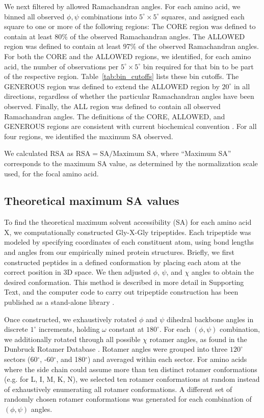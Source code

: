 \documentclass[11pt]{article}
\begin{document}
We next filtered by allowed Ramachandran angles. For each amino acid, we binned all observed $\phi, \psi$ combinations into $5^\circ\times5^\circ$ squares, and assigned each square to one or more of the following regions: The CORE region was defined to contain at least 80\% of the observed Ramachandran angles. The ALLOWED region was defined to contain at least 97\% of the observed Ramachandran angles. For both the CORE and the ALLOWED regions, we identified, for each amino acid, the number of observations per $5^\circ\times5^\circ$ bin required for that bin to be part of the respective region. Table~\ref{tab:bin_cutoffs} lists these bin cutoffs. The GENEROUS region was defined to extend the ALLOWED region by $20^\circ$ in all directions, regardless of whether the particular Ramachandran angles have been observed. Finally, the ALL region was defined to contain all observed Ramachandran angles. The definitions of the CORE, ALLOWED, and GENEROUS regions are consistent with current biochemical convention \cite{Morrisetal1992,Laskowskietal1993}. For all four regions, we identified the maximum SA observed.

We calculated RSA as $\text{RSA}=\text{SA}/\text{Maximum SA}$, where ``Maximum SA'' corresponds to the maximum SA value, as determined by the normalization scale used, for the focal amino acid. 



\subsection*{Theoretical maximum SA values}

To find the theoretical maximum solvent accessibility (SA) for each amino acid X, we computationally constructed Gly-X-Gly tripeptides. Each tripeptide was modeled by specifying coordinates of each constituent atom, using bond lengths and angles from our empirically mined protein structures. Briefly, we first constructed peptides in a defined conformation by placing each atom at the correct position in 3D space. We then adjusted $\phi$, $\psi$, and $\chi$ angles to obtain the desired conformation. This method is described in more detail in Supporting Text, and the computer code to carry out tripeptide construction has been published as a stand-alone library \cite{Tienetal2013}. 

Once constructed, we exhaustively rotated $\phi$ and $\psi$ dihedral backbone angles in discrete $1^\circ$ increments, holding $\omega$ constant at $180^\circ$. For each $(\phi, \psi)$ combination, we additionally rotated through all possible $\chi$ rotamer angles, as found in the Dunbruck Rotamer Database \cite{WangDunbrack2003}. Rotamer angles were grouped into three $120^\circ$ sectors (60$^\circ$, -60$^\circ$, and 180$^\circ$) and averaged within each sector. For amino acids where the side chain could assume more than ten distinct rotamer conformations (e.g. for L, I, M, K, N), we selected ten rotamer conformations at random instead of exhaustively enumerating all rotamer conformations. A different set of randomly chosen rotamer conformations was generated for each combination of $(\phi, \psi)$ angles. 
\end{document}
